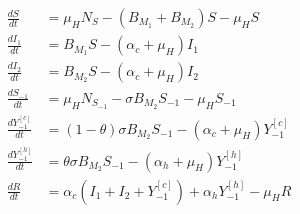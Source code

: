 \begin{equation}\label{eqn:model_two_strains2}
    \begin{aligned}
        \frac{dS}{dt} &=
            \mu_HN_S - (B_{M_1} + B_{M_2}) S
            -\mu_H S
        \\
        \frac{dI_1}{dt} &=
            B_{M_1} S
            -(\alpha_c + \mu_H) I_1
        \\
        \frac{dI_2}{dt} &=
            B_{M_2} S
            -(\alpha_c + \mu_H)I_2
        \\
        \frac{dS_{-1}}{dt} &=
            \mu_HN_{S_{-1}}- \sigma B_{M_2} S_{-1}-\mu_H S_{-1}
        \\
        \frac{dY_{-1} ^{[c]} }{dt} &=
            (1 - \theta) \sigma B_{M_2} S_{-1}
            -(\alpha_c + \mu_H) Y_{-1} ^ {[c]}
        \\
        \frac{dY_{-1}^{[h]}}{dt} &=
            \theta \sigma B_{M_2} S_{-1}
            -(\alpha_h + \mu_H)Y_{-1} ^{[h]} 
        \\
        \frac{dR}{dt} &= 
            \alpha_c 
                \left(
                    I_1 + I_2 + Y_{-1} ^{[c]}
                \right)
            + \alpha_h Y_{-1} ^ {[h]} - \mu_H R
    \end{aligned}
\end{equation}



%
%
